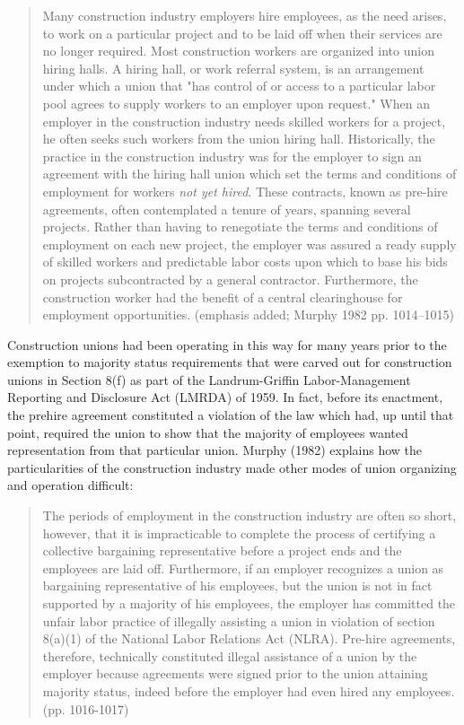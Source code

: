\begin{quote}
	Many construction industry employers hire employees, as the need arises, to work on a particular project and to be laid off when their services are no longer required. Most construction workers are organized into union hiring halls. A hiring hall, or work referral system, is an arrangement under which a union that "has control of or access to a particular labor pool agrees to supply workers to an employer upon request." When an employer in the construction industry needs skilled workers for a project, he often seeks such workers from the union hiring hall. Historically, the practice in the construction industry was for the employer to sign an agreement with the hiring hall union which set the terms and conditions of employment for workers \textit{not yet hired}. These contracts, known as pre-hire agreements, often contemplated a tenure of years, spanning several projects. Rather than having to renegotiate the terms and conditions of employment on each new project, the employer was assured a ready supply of skilled workers and predictable labor costs upon which to base his bids on projects subcontracted by a general contractor. Furthermore, the construction worker had the benefit of a central clearinghouse for employment opportunities. (emphasis added; Murphy 1982 pp. 1014–1015)
\end{quote}

Construction unions had been operating in this way for many years prior to the exemption to majority status requirements that were carved out for construction unions in Section 8(f) as part of the Landrum-Griffin Labor-Management Reporting and Disclosure Act (LMRDA) of 1959. In fact, before its enactment, the prehire agreement constituted a violation of the law which had, up until that point, required the union to show that the majority of employees wanted representation from that particular union. Murphy (1982) explains how the particularities of the construction industry made other modes of union organizing and operation difficult:

\begin{quote}
	The periods of employment in the construction industry are often so short, however, that it is impracticable to complete the process of certifying a collective bargaining representative before a project ends and the employees are laid off. Furthermore, if an employer recognizes a union as bargaining representative of his employees, but the union is not in fact supported by a majority of his employees, the employer has committed the unfair labor practice of illegally assisting a union in violation of section 8(a)(1) of the National Labor Relations Act (NLRA). Pre-hire agreements, therefore, technically constituted illegal assistance of a union by the employer because agreements were signed prior to the union attaining majority status, indeed before the employer had even hired any employees. (pp. 1016-1017)
\end{quote}

